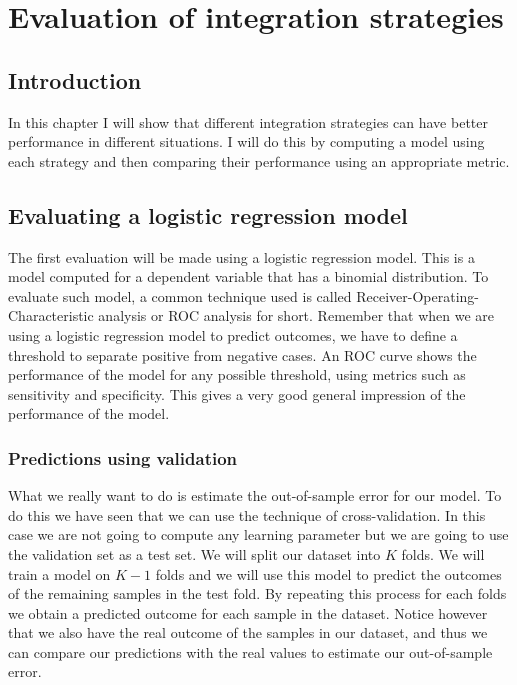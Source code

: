 \chapter{Evaluation of integration strategies}
\label{cha:evaluation}


\section{Introduction}
\label{sec:evaluation-introduction}
In this chapter I will show that different integration strategies can have better performance in different situations. I will do this by computing a model using each strategy and then comparing their performance using an appropriate metric.
\section{Evaluating a logistic regression model}
\label{sec:evaluation-logisticregression}
The first evaluation will be made using a logistic regression model. This is a model computed for a dependent variable that has a binomial distribution. To evaluate such model, a common technique used is called Receiver-Operating-Characteristic analysis or ROC analysis for short. Remember that when we are using a logistic regression model to predict outcomes, we have to define a threshold to separate positive from negative cases. An ROC curve shows the performance of the model for any possible threshold, using metrics such as sensitivity and specificity. This gives a very good general impression of the performance of the model.
\subsection{Predictions using validation}
What we really want to do is estimate the out-of-sample error for our model. To do this we have seen that we can use the technique of cross-validation. In this case we are not going to compute any learning parameter but we are going to use the validation set as a test set. We will split our dataset into $K$ folds. We will train a model on $K-1$ folds and we will use this model to predict the outcomes of the remaining samples in the test fold. By repeating this process for each folds we obtain a predicted outcome for each sample in the dataset. Notice however that we also have the real outcome of the samples in our dataset, and thus we can compare our predictions with the real values to estimate our out-of-sample error.
